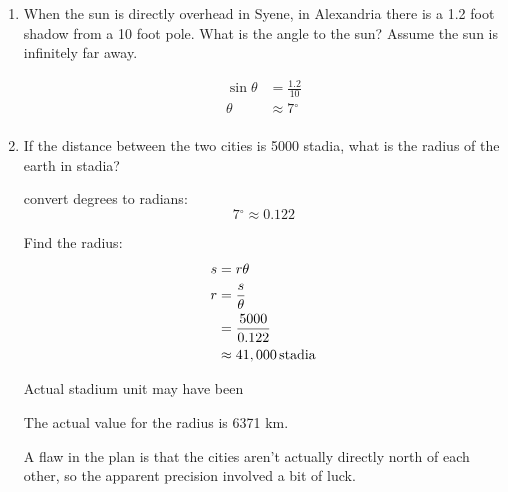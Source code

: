 \documentclass{exam}
\newcommand{\dg}{\ensuremath{^\circ}}
\begin{document}
  \begin{enumerate}
    \item When the sun is directly overhead in Syene, in Alexandria there is a 1.2 foot shadow from a 10 foot pole.
    What is the angle to the sun?  Assume the sun is infinitely far away.

      \begin{solution}
        \begin{align*}
          \sin \theta &= \frac{1.2}{10} \\
          \theta &\approx 7 \dg \\
        \end{align*}
      \end{solution}

    \item If the distance between the two cities is 5000 stadia, what is the radius of the earth in stadia?
      \begin{solution}
        convert degrees to radians:
        \[
          7 \dg \approx 0.122
        \]

        Find the radius:
        \begin{align*}
          s & = r \theta \\
          r & = \frac{s}{\theta} \\
            & = \frac{5000}{0.122} \\
            & \approx \unit[41,000]{stadia} \\
        \end{align*}

        Actual stadium unit may have been 

        The actual value for the radius is 6371 km.

        A flaw in the plan is that the cities aren't actually directly north of each other, so the apparent precision
        involved a bit of luck.

      \end{solution}
  \end{enumerate}
\end{document}
